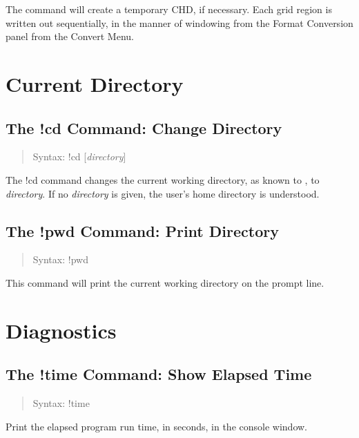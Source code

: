 The command will create a temporary CHD, if necessary.  Each grid
region is written out sequentially, in the manner of windowing from
the {\cb Format Conversion} panel from the {\cb Convert Menu}.


\section{Current Directory}

\subsection{The {\cb !cd} Command: Change Directory}
\begin{quote}
Syntax: {\vt !cd} [{\it directory\/}]
\end{quote}
The {\cb !cd} command changes the current working directory, as known
to {\Xic}, to {\it directory}.  If no {\it directory} is given, the user's
home directory is understood.

\subsection{The {\cb !pwd} Command: Print Directory}
\begin{quote}
Syntax: {\vt !pwd}
\end{quote}
This command will print the {\Xic} current working directory on the
prompt line.


\section{Diagnostics}

\subsection{The {\cb !time} Command: Show Elapsed Time}
\begin{quote}
Syntax: {\vt !time}
\end{quote}
Print the elapsed program run time, in seconds, in the console window.

